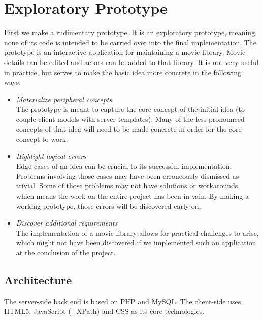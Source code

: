 \documentclass[thesis.tex]{subfiles}
\begin{document}
\chapter{Exploratory Prototype}
\label{chap:prototype}
First we make a rudimentary prototype. It is an exploratory prototype,
meaning none of its code is intended to be carried over into the final
implementation.
The prototype is an interactive application for maintaining a movie
library. Movie details can be edited and actors can be added to that library.
It is not very useful in practice, but serves to make the basic idea more
concrete in the following ways:

\begin{itemize}
	\label{list:prototype-motivation}
	\item \emph{Materialize peripheral concepts}\\
	The prototype is meant to capture the core concept of the initial idea
	(to couple client models with server templates).
	Many of the less pronounced concepts of that idea will need to be made
	concrete in order for the core concept to work.
	\item \emph{Highlight logical errors}\\
	Edge cases of an idea can be crucial to its successful implementation.
	Problems involving those cases may have been erroneously dismissed as trivial.
	Some of those problems may not have solutions or workarounds, which
	means the work on the entire project has been in vain. By making a working
	prototype, those errors will be discovered early on.
	\item \emph{Discover additional requirements}\\
	The implementation of a movie library allows for practical challenges to
	arise, which might not have been discovered if we implemented such an
	application at the conclusion of the project.
\end{itemize}

\section{Architecture}

The server-side back end is based on PHP and MySQL. The client-side uses
HTML5, JavaScript (+XPath) and CSS as its core technologies.
\end{document}

